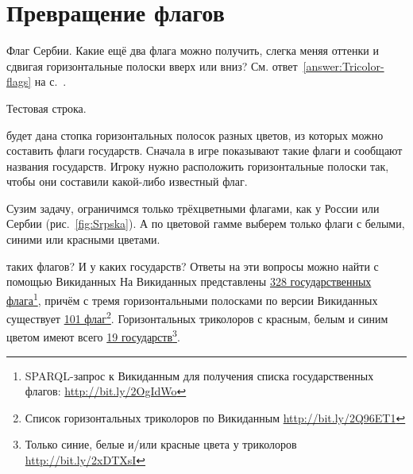 \chapter{Превращение флагов}
\label{ch:draughts-moves}

\begin{marginfigure}[-2em]
{%
\setlength{\fboxsep}{0pt}%
\setlength{\fboxrule}{1pt}%
%
}%

\caption{Флаг Сербии. Какие ещё два флага можно получить, слегка меняя оттенки 
    и сдвигая горизонтальные полоски вверх или вниз? 
    См. ответ~\ref{answer:Tricolor-flags} на с.~\pageref{answer:Tricolor-flags}.}
\label{fig:Srpska}
\end{marginfigure}

Тестовая строка.

 будет дана стопка горизонтальных полосок разных цветов, 
из которых можно составить флаги государств. Сначала в игре показывают такие флаги и сообщают названия государств.
Игроку нужно расположить горизонтальные полоски так, чтобы они составили какой-либо известный флаг. 

Сузим задачу, ограничимся только трёхцветными флагами, как у России 
или Сербии (рис.~\ref{fig:Srpska}).
А по цветовой гамме выберем только флаги с белыми, синими или красными цветами.

 таких флагов? И у каких государств? Ответы на эти вопросы 
можно найти с помощью Викиданных %
На Викиданных представлены \href{http://bit.ly/2OgIdWo}{328 государственных флага}\footnote[][-3cm]{
    SPARQL-запрос к Викиданным для получения списка государственных флагов: \url{http://bit.ly/2OgIdWo}
}, 
причём с тремя горизонтальными полосками по версии Викиданных 
существует \href{http://bit.ly/2Q96ET1}{101 флаг}\footnote[][-2.8cm]{
    Список горизонтальных триколоров по Викиданным
    \url{http://bit.ly/2Q96ET1}
}. 
Горизонтальных триколоров с красным, белым и синим цветом 
имеют всего \href{http://bit.ly/2xDTXsI}{19 государств}\footnote[][-2.0cm]{
    Только синие, белые и/или красные цвета у триколоров 
    \url{http://bit.ly/2xDTXsI}
    \bigskip 
}.



